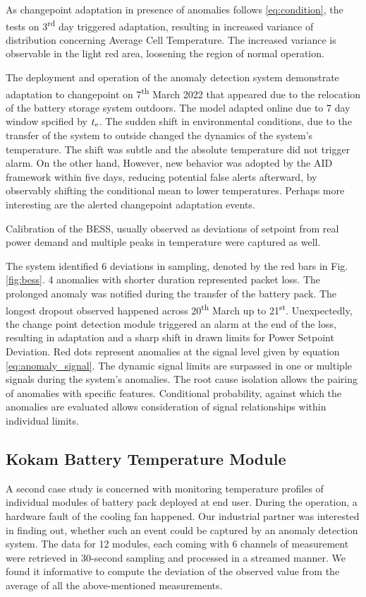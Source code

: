 As changepoint adaptation in presence of anomalies follows \eqref{eq:condition}, the tests on 3\textsuperscript{rd} day triggered adaptation, resulting in increased variance of distribution concerning Average Cell Temperature. The increased variance is observable in the light red area, loosening the region of normal operation.

The deployment and operation of the anomaly detection system demonstrate adaptation to changepoint on 7\textsuperscript{th} March 2022 that appeared due to the relocation of the battery storage system outdoors. The model adapted online due to 7 day window spcified by $t _{\text{e}}$. The sudden shift in environmental conditions, due to the transfer of the system to outside changed the dynamics of the system's temperature. The shift was subtle and the absolute temperature did not trigger alarm. On the other hand, However, new behavior was adopted by the AID framework within five days, reducing potential false alerts afterward, by observably shifting the conditional mean to lower temperatures. Perhaps more interesting are the alerted changepoint adaptation events.

Calibration of the BESS, usually observed as deviations of setpoint from real power demand and multiple peaks in temperature were captured as well.

The system identified 6 deviations in sampling, denoted by the red bars in Fig. \ref{fig:bess}. 4 anomalies with shorter duration represented packet loss. The prolonged anomaly was notified during the transfer of the battery pack. The longest dropout observed happened across 20\textsuperscript{th} March up to 21\textsuperscript{st}. Unexpectedly, the change point detection module triggered an alarm at the end of the loss, resulting in adaptation and a sharp shift in drawn limits for Power Setpoint Deviation. Red dots represent anomalies at the signal level given by equation \eqref{eq:anomaly_signal}. The dynamic signal limits are surpassed in one or multiple signals during the system's anomalies. The root cause isolation allows the pairing of anomalies with specific features. Conditional probability, against which the anomalies are evaluated allows consideration of signal relationships within individual limits.

\subsection{Kokam Battery Temperature Module}\label{AA:Kokam}
A second case study is concerned with monitoring temperature profiles of individual modules of battery pack deployed at end user. During the operation, a hardware fault of the cooling fan happened. Our industrial partner was interested in finding out, whether such an event could be captured by an anomaly detection system. The data for 12 modules, each coming with 6 channels of measurement were retrieved in 30-second sampling and processed in a streamed manner. We found it informative to compute the deviation of the observed value from the average of all the above-mentioned measurements.

